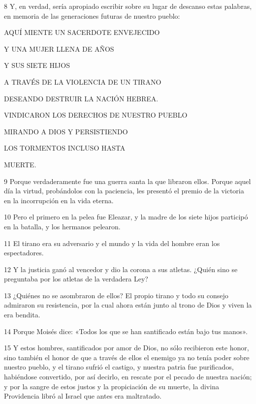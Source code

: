 \par 8 Y, en verdad, sería apropiado escribir sobre su lugar de descanso estas palabras, en memoria de las generaciones futuras de nuestro pueblo:

\par AQUÍ MIENTE UN SACERDOTE ENVEJECIDO
\par Y UNA MUJER LLENA DE AÑOS
\par Y SUS SIETE HIJOS
\par A TRAVÉS DE LA VIOLENCIA DE UN TIRANO
\par DESEANDO DESTRUIR LA NACIÓN HEBREA.
\par VINDICARON LOS DERECHOS DE NUESTRO PUEBLO
\par MIRANDO A DIOS Y PERSISTIENDO
\par LOS TORMENTOS INCLUSO HASTA
\par MUERTE.

\par 9 Porque verdaderamente fue una guerra santa la que libraron ellos. Porque aquel día la virtud, probándolos con la paciencia, les presentó el premio de la victoria en la incorrupción en la vida eterna.

\par 10 Pero el primero en la pelea fue Eleazar, y la madre de los siete hijos participó en la batalla, y los hermanos pelearon.

\par 11 El tirano era su adversario y el mundo y la vida del hombre eran los espectadores.

\par 12 Y la justicia ganó al vencedor y dio la corona a sus atletas. ¿Quién sino se preguntaba por los atletas de la verdadera Ley?

\par 13 ¿Quiénes no se asombraron de ellos? El propio tirano y todo su consejo admiraron su resistencia, por la cual ahora están junto al trono de Dios y viven la era bendita.

\par 14 Porque Moisés dice: «Todos los que se han santificado están bajo tus manos».

\par 15 Y estos hombres, santificados por amor de Dios, no sólo recibieron este honor, sino también el honor de que a través de ellos el enemigo ya no tenía poder sobre nuestro pueblo, y el tirano sufrió el castigo, y nuestra patria fue purificados, habiéndose convertido, por así decirlo, en rescate por el pecado de nuestra nación; y por la sangre de estos justos y la propiciación de su muerte, la divina Providencia libró al Israel que antes era maltratado.

